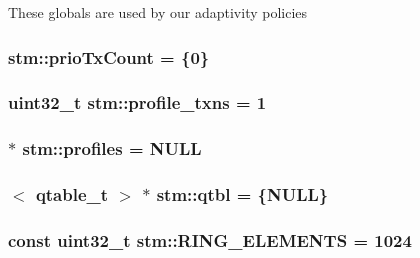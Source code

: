 These globals are used by our adaptivity policies \hypertarget{namespacestm_a487249084a21cda5f208d7a25b3c385e}{
\subsubsection[{prio\-Tx\-Count}]{ stm\-::prio\-Tx\-Count = \{0\}}}\label{namespacestm_a487249084a21cda5f208d7a25b3c385e}
\hypertarget{namespacestm_a3b7951049cf91d2e3d63444f6aa31b31}{
\subsubsection[{profile\-\_\-txns}]{\setlength{\rightskip}{0pt plus 5cm}uint32\-\_\-t stm\-::profile\-\_\-txns = 1}}\label{namespacestm_a3b7951049cf91d2e3d63444f6aa31b31}
\hypertarget{namespacestm_a0c5d34db2778717a0766a164ccf9b40f}{
\subsubsection[{profiles}]{ $\ast$ stm\-::profiles = N\-U\-L\-L}}\label{namespacestm_a0c5d34db2778717a0766a164ccf9b40f}
\hypertarget{namespacestm_a93eff2ad5eaf4e9c0661b0214c35bd1b}{
\subsubsection[{qtbl}]{$<$ {\bf qtable\-\_\-t} $>$ $\ast$ stm\-::qtbl = \{N\-U\-L\-L\}}}\label{namespacestm_a93eff2ad5eaf4e9c0661b0214c35bd1b}
\hypertarget{namespacestm_aff01348819bdc4955bee1bfbecd22c1a}{
\subsubsection[{R\-I\-N\-G\-\_\-\-E\-L\-E\-M\-E\-N\-T\-S}]{\setlength{\rightskip}{0pt plus 5cm}const uint32\-\_\-t stm\-::\-R\-I\-N\-G\-\_\-\-E\-L\-E\-M\-E\-N\-T\-S = 1024\hspace{0.3cm}{\ttfamily [static]}}}\label{namespacestm_aff01348819bdc4955bee1bfbecd22c1a}
